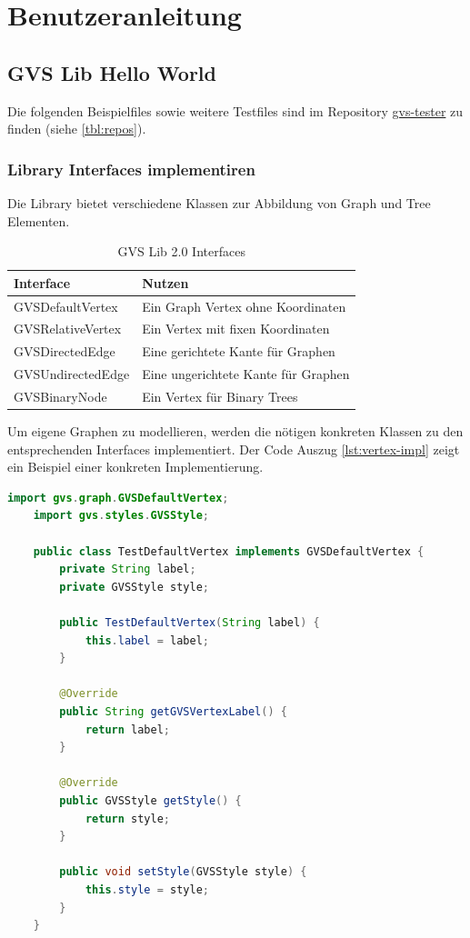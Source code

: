 \documentclass[11pt,a4paper,english,oneside]{book}
\numberwithin{equation}{chapter}
\begin{document}
	
	\chapter{Benutzeranleitung}
	\section{GVS Lib Hello World}
	Die folgenden Beispielfiles sowie weitere Testfiles sind im Repository \href{https://github.com/Graphs-Visualization-Service/gvs-tester}{gvs-tester} zu finden (siehe \ref{tbl:repos}).
	
	\subsection{Library Interfaces implementiren}
	Die Library bietet verschiedene Klassen zur Abbildung von Graph und Tree Elementen.
	
	\begin{table}[h!]
	\centering
	\begin{tabularx}{\linewidth}{l l}
		\toprule 
		Interface & Nutzen \\
		\midrule
		GVSDefaultVertex & Ein Graph Vertex ohne Koordinaten \\
		GVSRelativeVertex & Ein Vertex mit fixen Koordinaten \\
		GVSDirectedEdge & Eine gerichtete Kante für Graphen \\
		GVSUndirectedEdge & Eine ungerichtete Kante für Graphen \\
		GVSBinaryNode & Ein Vertex für Binary Trees \\
		\bottomrule 
	\end{tabularx} 
	\caption{GVS Lib 2.0 Interfaces} 
	\label{tbl:Interfaces}
	\end{table}

	Um eigene Graphen zu modellieren, werden die nötigen konkreten Klassen zu den entsprechenden Interfaces implementiert. Der Code Auszug \ref{lst:vertex-impl} zeigt ein Beispiel einer konkreten Implementierung.
	
	\begin{lstlisting}[language=java, frame=single, caption={DefaultVertex Implementierung}, label={lst:vertex-impl}]
	import gvs.graph.GVSDefaultVertex;
	import gvs.styles.GVSStyle;
	
	public class TestDefaultVertex implements GVSDefaultVertex {
		private String label;
		private GVSStyle style;
		
		public TestDefaultVertex(String label) {
			this.label = label;
		}
			
		@Override
		public String getGVSVertexLabel() {
			return label;
		}
		
		@Override
		public GVSStyle getStyle() {
			return style;
		}
		
		public void setStyle(GVSStyle style) {
			this.style = style;
		}
	}
	\end{lstlisting}
	
\end{document}
